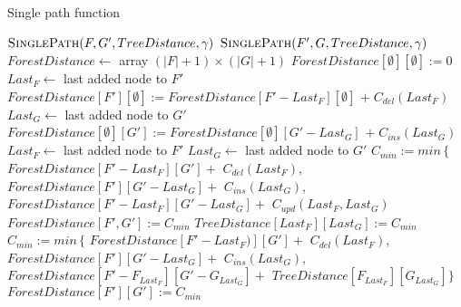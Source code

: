 \begin{algorithm}
  \caption{Single path function}
  \label{alg:spf}
  \begin{algorithmic}[1]
          \State $\Call{SinglePath}{F, G', TreeDistance, \gamma}$
        \EndFor
      \Else
          \State $\Call{SinglePath}{F', G, TreeDistance, \gamma}$
        \EndFor
      \EndIf
    \EndProcedure
    \\
    \State $ForestDistance \gets$ array $(|F| + 1) \times (|G| + 1)$
      \State $ForestDistance[\emptyset][\emptyset] := 0$
        \State $Last_{F} \gets$ last added node to $F'$
        \State $ForestDistance[F'][\emptyset] := ForestDistance[F' - Last_{F}][\emptyset]$
        \Indent
          \State $+ \; C_{del}(Last_{F})$
        \EndIndent
      \EndFor
        \State $Last_{G} \gets$ last added node to $G'$
        \State $ForestDistance[\emptyset][G'] := ForestDistance[\emptyset][G' - Last_{G}]$
        \Indent
          \State $+ \; C_{ins}(Last_{G})$
        \EndIndent
      \EndFor
          \State $Last_{F} \gets$ last added node to $F'$
          \State $Last_{G} \gets$ last added node to $G'$
          \label{alg:spf:iftrees}
            \State $C_{min} := min \, \{$
            \Indent
            \State $ForestDistance[F' - Last_{F}][G'] +$
              \Indent
                \State $C_{del}(Last_{F})$,
              \EndIndent
              \State $ForestDistance[F'][G' - Last_{G}] +$
              \Indent
                \State $C_{ins}(Last_{G})$,
              \EndIndent
              \State $ForestDistance[F' - Last_{F}][G' - Last_{G}] +$
              \Indent
                \State $C_{upd}(Last_{F}, Last_{G})$
              \EndIndent
            \EndIndent
            \State $ForestDistance[F', G'] := C_{min}$
            \State $TreeDistance[Last_{F}][Last_{G}] := C_{min}$
          \Else
          \label{alg:spf:ifforests}
            \State $C_{min} := min \, \{$
            \Indent
              \State $ForestDistance[F' - Last_{F})][G'] +$
              \Indent
                \State $C_{del}(Last_{F})$,
              \EndIndent
              \State $ForestDistance[F'][G' - Last_{G}] +$
              \Indent
                \State $C_{ins}(Last_{G})$,
              \EndIndent
              \State $ForestDistance[F' - F_{Last_{F}}][G' - G_{Last_{G}}] +$
              \Indent
                \State $TreeDistance[F_{Last_{F}}][G_{Last_{G}}]\}$
              \EndIndent
            \EndIndent
            \State $ForestDistance[F'][G'] := C_{min}$
          \EndIf
        \EndFor
      \EndFor
    \EndProcedure
  \end{algorithmic}
\end{algorithm}

